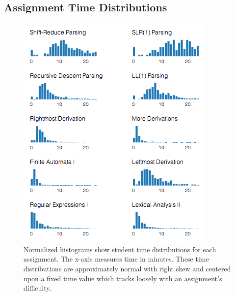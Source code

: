 \documentclass{sigchi}
\begin{document}
\subsection{Assignment Time Distributions}
\begin{figure}[tb]
\centering
\includegraphics[width=1\columnwidth]{hist_short}
\caption{Normalized histograms show student time distributions for each assignment. The x-axis measures time in minutes. These time distributions are approximately normal with right skew and centered upon a fixed time value which tracks loosely with an assignment's difficulty.}
\label{fig:distributions}
\end{figure}
\end{document}
